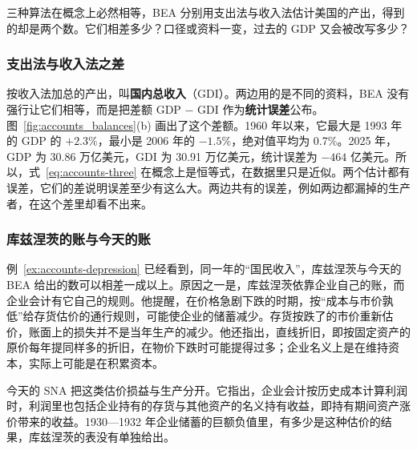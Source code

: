 三种算法在概念上必然相等，BEA 分别用支出法与收入法估计美国的产出，得到的却是两个数。它们相差多少？口径或资料一变，过去的 GDP 又会被改写多少？

\subsubsection{支出法与收入法之差}
按收入法加总的产出，叫\textbf{国内总收入}（GDI）。两边用的是不同的资料，BEA 没有强行让它们相等，而是把差额 GDP $-$ GDI 作为\textbf{统计误差}公布。图~\ref{fig:accounts_balances}(b) 画出了这个差额。1960 年以来，它最大是 1993 年的 GDP 的 $+2.3\%$，最小是 2006 年的 $-1.5\%$，绝对值平均为 0.7\%。2025 年，GDP 为 30.86 万亿美元，GDI 为 30.91 万亿美元，统计误差为 $-464$ 亿美元\cite{bea2026}。所以，式~\eqref{eq:accounts-three} 在概念上是恒等式，在数据里只是近似。两个估计都有误差，它们的差说明误差至少有这么大。两边共有的误差，例如两边都漏掉的生产者，在这个差里却看不出来。

\subsubsection{库兹涅茨的账与今天的账}
例~\ref{ex:accounts-depression} 已经看到，同一年的“国民收入”，库兹涅茨与今天的 BEA 给出的数可以相差一成以上。原因之一是，库兹涅茨依靠企业自己的账，而企业会计有它自己的规则。他提醒，在价格急剧下跌的时期，按“成本与市价孰低”给存货估价的通行规则，可能使企业的储蓄减少\cite{kuznets1934}。存货按跌了的市价重新估价，账面上的损失并不是当年生产的减少。他还指出，直线折旧，即按固定资产的原价每年提同样多的折旧，在物价下跌时可能提得过多；企业名义上是在维持资本，实际上可能是在积累资本\cite{kuznets1934}。

今天的 SNA 把这类估价损益与生产分开。它指出，企业会计按历史成本计算利润时，利润里也包括企业持有的存货与其他资产的名义持有收益，即持有期间资产涨价带来的收益\cite{sna2008}。1930—1932 年企业储蓄的巨额负值里，有多少是这种估价的结果，库兹涅茨的表没有单独给出。


